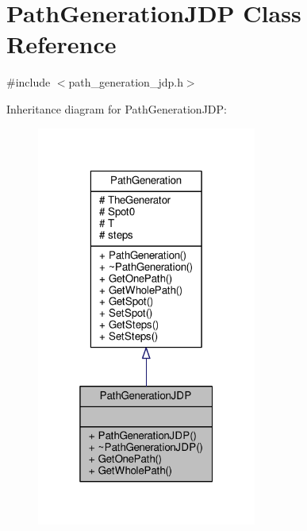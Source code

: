 \hypertarget{classPathGenerationJDP}{}\section{Path\+Generation\+J\+DP Class Reference}
\label{classPathGenerationJDP}


{\ttfamily \#include $<$path\+\_\+generation\+\_\+jdp.\+h$>$}



Inheritance diagram for Path\+Generation\+J\+DP\+:
\nopagebreak
\begin{figure}[H]
\begin{center}
\leavevmode
\includegraphics[width=205pt]{classPathGenerationJDP__inherit__graph}
\end{center}
\end{figure}


